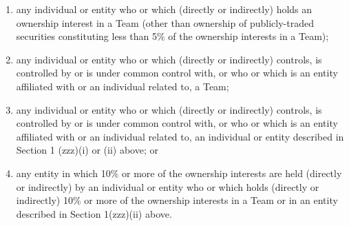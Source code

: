 \documentclass[
]{book}
\providecommand{\tightlist}{%
  \setlength{\itemsep}{0pt}\setlength{\parskip}{0pt}}
\begin{document}
\begin{enumerate}
  \begin{enumerate}
  \def\labelenumii{(\roman{enumii})}
  \tightlist
  \item
    any individual or entity who or which (directly or indirectly) holds an ownership interest in a Team (other than ownership of publicly-traded securities constituting less than 5\% of the ownership interests in a Team);
  \item
    any individual or entity who or which (directly or indirectly) controls, is controlled by or is under common control with, or who or which is an entity affiliated with or an individual related to, a Team;
  \item
    any individual or entity who or which (directly or indirectly) controls, is controlled by or is under common control with, or who or which is an entity affiliated with or an individual related to, an individual or entity described in Section 1 (zzz)(i) or (ii) above; or
  \item
    any entity in which 10\% or more of the ownership interests are held (directly or indirectly) by an individual or entity who or which holds (directly or indirectly) 10\% or more of the ownership interests in a Team or in an entity described in Section 1(zzz)(ii) above.
  \end{enumerate}


\end{enumerate}
\end{document}

